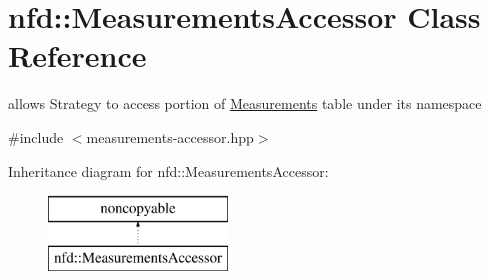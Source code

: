 \hypertarget{classnfd_1_1MeasurementsAccessor}{}\section{nfd\+:\+:Measurements\+Accessor Class Reference}
\label{classnfd_1_1MeasurementsAccessor}


allows Strategy to access portion of \hyperlink{classnfd_1_1Measurements}{Measurements} table under its namespace  




{\ttfamily \#include $<$measurements-\/accessor.\+hpp$>$}

Inheritance diagram for nfd\+:\+:Measurements\+Accessor\+:\begin{figure}[H]
\begin{center}
\leavevmode
\includegraphics[height=2.000000cm]{classnfd_1_1MeasurementsAccessor}
\end{center}
\end{figure}
